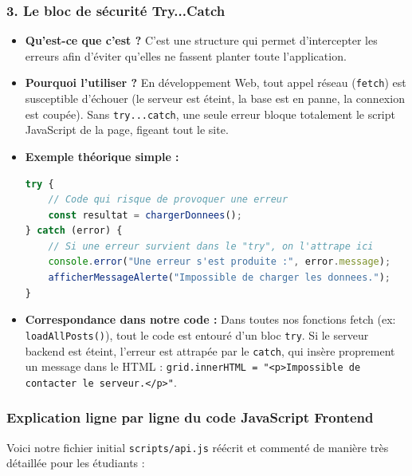 \subsubsection{3. Le bloc de sécurité Try...Catch}
\begin{itemize}
    \item \textbf{Qu'est-ce que c'est ?} C'est une structure qui permet d'intercepter les erreurs afin d'éviter qu'elles ne fassent planter toute l'application.
    \item \textbf{Pourquoi l'utiliser ?} En développement Web, tout appel réseau (\texttt{fetch}) est susceptible d'échouer (le serveur est éteint, la base est en panne, la connexion est coupée). Sans \texttt{try...catch}, une seule erreur bloque totalement le script JavaScript de la page, figeant tout le site.
    \item \textbf{Exemple théorique simple :}
    \begin{lstlisting}[language=JavaScript]
try {
    // Code qui risque de provoquer une erreur
    const resultat = chargerDonnees();
} catch (error) {
    // Si une erreur survient dans le "try", on l'attrape ici
    console.error("Une erreur s'est produite :", error.message);
    afficherMessageAlerte("Impossible de charger les donnees.");
}
    \end{lstlisting}
    \item \textbf{Correspondance dans notre code :}
    Dans toutes nos fonctions fetch (ex: \texttt{loadAllPosts()}), tout le code est entouré d'un bloc \texttt{try}. Si le serveur backend est éteint, l'erreur est attrapée par le \texttt{catch}, qui insère proprement un message dans le HTML : \texttt{grid.innerHTML = "<p>Impossible de contacter le serveur.</p>"}.
\end{itemize}

\subsubsection{Explication ligne par ligne du code JavaScript Frontend}
Voici notre fichier initial \texttt{scripts/api.js} réécrit et commenté de manière très détaillée pour les étudiants :

